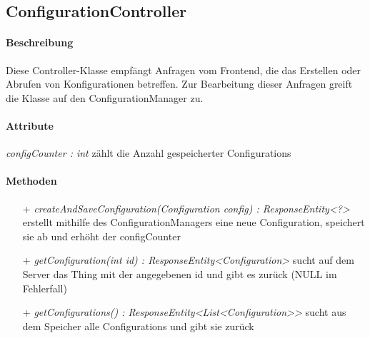 \subsection{ConfigurationController}

\paragraph{Beschreibung}
Diese Controller-Klasse empfängt Anfragen vom Frontend, die das Erstellen oder Abrufen von Konfigurationen betreffen. Zur Bearbeitung dieser Anfragen greift die Klasse auf den ConfigurationManager zu.


\paragraph{Attribute}
\item \textit{configCounter : int} zählt die Anzahl gespeicherter Configurations

\paragraph{Methoden}
\begin{itemize}
\item[+] \textit{ createAndSaveConfiguration(Configuration config) : ResponseEntity<?> }
erstellt mithilfe des ConfigurationManagers eine neue Configuration, speichert sie ab und erhöht der configCounter
\item[+] \textit{getConfiguration(int id) : ResponseEntity<Configuration>}
sucht auf dem Server das Thing mit der angegebenen id und gibt es zurück (NULL im Fehlerfall)
\item[+] \textit{getConfigurations() : ResponseEntity<List<Configuration>> }
sucht aus dem Speicher alle Configurations und gibt sie zurück
\end{itemize}